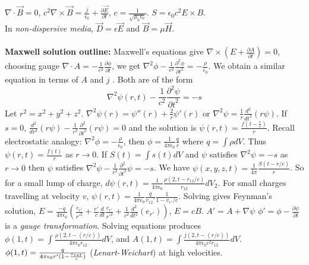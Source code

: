$\nabla \cdot {\vec B} = 0$,
${c^{2}} \nabla \times {\vec B} = {\frac {j} {\epsilon_{0}}} +
{\frac {\partial {\vec E}} {\partial t}}$, $c= {\frac 1 {\sqrt { \mu_0 \epsilon_0}}}$.
$S= \epsilon_0 c^2 E \times B$.
\\
In \emph{non-dispersive media}, ${\vec D} = \epsilon {\vec E} $ and ${\vec B} = \mu {\vec H}$.
\\
\\
{\bf Maxwell solution outline:} 
Maxwell's equations give $\nabla \times (E+{\frac {\partial A} {\partial t}})= 0$, choosing
gauge 
$\nabla \cdot A= -{\frac 1 {c^2}} {\frac {\partial \phi} {\partial t}}$, we get
$\nabla^2 \phi - {\frac 1 {c^2}} {\frac {\partial^2 \phi} {{\partial t}^2}} = - {\frac
{\rho} {\epsilon_0}}$.  We obtain a similar equation in terms of $A$ and $j$ .  Both are of
the form
$$\nabla^2 \psi(r,t)- {\frac 1 {c^2}} {\frac {\partial^2 \psi} {{\partial t}^2}}= -s$$
Let $r^2=x^2+y^2+z^2$. $\nabla^2 \psi(r) = \psi''(r) + {\frac 2 r} \psi'(r)$ or
$\nabla^2 \psi = {\frac 1 r} {\frac {d^2} {dt^2}} (r \psi)$.  If $s=0$,
${\frac {d^2} {dr^2}} (r \psi) - {\frac 1 {c^2}} {\frac {\partial^2}{{\partial t}^2}} (r \psi) = 0$
and the solution is $\psi(r,t)= {\frac {f(t-{\frac r c})} r}$.  Recall electrostatic
analogy: $\nabla^2 \phi= -{\frac {\rho} {\epsilon_0}}$, then $\phi= {\frac 1 {4 \pi \epsilon_0}}
{\frac q r}$ where $q= \int \rho dV$.  
Thus $\psi(r,t)= {\frac {f(t)} r}$ as $r \rightarrow 0$.
If $S(t) = \int s(t) dV$ and $\psi$ satisfies $\nabla^2 \psi= -s$ as $r \rightarrow 0$ then
$\psi$ satisfies $\nabla^2 \psi - {\frac 1 {c^2}} {\frac {\partial^2} {{\partial t}^2}} \psi= -s$.
We have $\psi(x,y,z,t)= {\frac 1 {4 \pi}} {\frac {S(t-r/c)} r}$.  So for a small
lump of charge, $d \psi(r,t) = {\frac 1 {4 \pi \epsilon_0}} {\frac {\rho(2,t-r_{12}/c)}
{r_{12}}} dV_2$.  For small charges travelling at velocity $v$,
$\psi(r,t)= {\frac 1 {4 \pi \epsilon_0}} {\frac q {r_{12}'}} {\frac 1 {1- v_{r'}/c}}$.
Solving gives Feynman's solution,
$E= {\frac {-q} {4 \pi \epsilon_{0}}} ({\frac {e_{r'}} {r'^2}}+
{\frac {r'} {c}} {\frac {d} {dt}}{\frac {e_{r'}} {r'^2}} +
{\frac {1} {c^{2}}} {\frac {d^{2}} {{dt}{^2}}}(e_{r'}))$,
$E=cB$.
$A'= A + \nabla \psi$ $\phi'= \phi - {\frac {\partial \psi} {\partial t}}$
is a \emph{gauge transformation}.  Solving equations produces
$\phi (1,t) = \int {\frac {\rho (2,t - (r/c))}{4 \pi \epsilon_{0} r_{12}}} dV$, and
$A(1,t) = \int {\frac {j(2,t - (r/c))}{ 4 \pi \epsilon_{0} c^{2} r_{12}}} dV $.
$\phi(1,t)= {\frac q {4 \pi \epsilon_0 r' (1- {\frac {v_{\small{ret}}} c})}}$
(\emph{Lenart-Weichart}) at high velocities.
